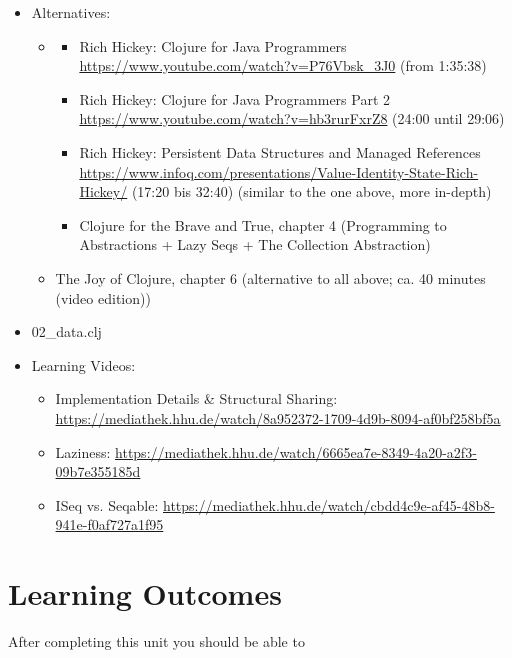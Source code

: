\documentclass[11pt,a4paper]{article}
\begin{document}
\begin{itemize}
    \item Alternatives:
        \begin{itemize}
            \item 
                \begin{itemize}
\item Rich Hickey: Clojure for Java Programmers \url{https://www.youtube.com/watch?v=P76Vbsk_3J0} (from 1:35:38)
\item Rich Hickey: Clojure for Java Programmers Part 2 \url{https://www.youtube.com/watch?v=hb3rurFxrZ8} (24:00 until 29:06)
\item Rich Hickey: Persistent Data Structures and Managed References \url{https://www.infoq.com/presentations/Value-Identity-State-Rich-Hickey/} (17:20 bis 32:40) (similar to the one above, more in-depth)
\item Clojure for the Brave and True, chapter 4 (Programming to Abstractions + Lazy Seqs + The Collection Abstraction)
                \end{itemize}
\item The Joy of Clojure, chapter 6 (alternative to all above; ca. 40 minutes (video edition))
        \end{itemize}
\item 02\_data.clj
\item Learning Videos:
    \begin{itemize}
        \item Implementation Details \& Structural Sharing: \url{https://mediathek.hhu.de/watch/8a952372-1709-4d9b-8094-af0bf258bf5a}
        \item Laziness: \url{https://mediathek.hhu.de/watch/6665ea7e-8349-4a20-a2f3-09b7e355185d}
        \item ISeq vs. Seqable: \url{https://mediathek.hhu.de/watch/cbdd4c9e-af45-48b8-941e-f0af727a1f95}
    \end{itemize}
\end{itemize}


\section{Learning Outcomes}

After completing this unit you should be able to
\end{document}
